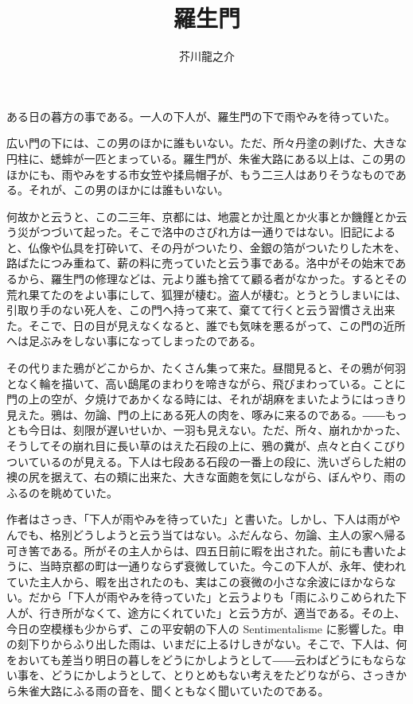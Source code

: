 \documentclass[tate,book,paper=a4]{jlreq}
\title{羅生門}
\author{芥川龍之介}
\begin{document}
\maketitle
ある日の暮方の事である。一人の下人が、羅生門の下で雨やみを待っていた。\par
広い門の下には、この男のほかに誰もいない。ただ、所々丹塗の剥げた、大きな円柱に、蟋蟀が一匹とまっている。羅生門が、朱雀大路にある以上は、この男のほかにも、雨やみをする市女笠や揉烏帽子が、もう二三人はありそうなものである。それが、この男のほかには誰もいない。\par
何故かと云うと、この二三年、京都には、地震とか辻風とか火事とか饑饉とか云う災がつづいて起った。そこで洛中のさびれ方は一通りではない。旧記によると、仏像や仏具を打砕いて、その丹がついたり、金銀の箔がついたりした木を、路ばたにつみ重ねて、薪の料に売っていたと云う事である。洛中がその始末であるから、羅生門の修理などは、元より誰も捨てて顧る者がなかった。するとその荒れ果てたのをよい事にして、狐狸が棲む。盗人が棲む。とうとうしまいには、引取り手のない死人を、この門へ持って来て、棄てて行くと云う習慣さえ出来た。そこで、日の目が見えなくなると、誰でも気味を悪るがって、この門の近所へは足ぶみをしない事になってしまったのである。\par
その代りまた鴉がどこからか、たくさん集って来た。昼間見ると、その鴉が何羽となく輪を描いて、高い鴟尾のまわりを啼きながら、飛びまわっている。ことに門の上の空が、夕焼けであかくなる時には、それが胡麻をまいたようにはっきり見えた。鴉は、勿論、門の上にある死人の肉を、啄みに来るのである。――もっとも今日は、刻限が遅いせいか、一羽も見えない。ただ、所々、崩れかかった、そうしてその崩れ目に長い草のはえた石段の上に、鴉の糞が、点々と白くこびりついているのが見える。下人は七段ある石段の一番上の段に、洗いざらした紺の襖の尻を据えて、右の頬に出来た、大きな面皰を気にしながら、ぼんやり、雨のふるのを眺めていた。\par
作者はさっき、「下人が雨やみを待っていた」と書いた。しかし、下人は雨がやんでも、格別どうしようと云う当てはない。ふだんなら、勿論、主人の家へ帰る可き筈である。所がその主人からは、四五日前に暇を出された。前にも書いたように、当時京都の町は一通りならず衰微していた。今この下人が、永年、使われていた主人から、暇を出されたのも、実はこの衰微の小さな余波にほかならない。だから「下人が雨やみを待っていた」と云うよりも「雨にふりこめられた下人が、行き所がなくて、途方にくれていた」と云う方が、適当である。その上、今日の空模様も少からず、この平安朝の下人の Sentimentalisme に影響した。申の刻下りからふり出した雨は、いまだに上るけしきがない。そこで、下人は、何をおいても差当り明日の暮しをどうにかしようとして――云わばどうにもならない事を、どうにかしようとして、とりとめもない考えをたどりながら、さっきから朱雀大路にふる雨の音を、聞くともなく聞いていたのである。\par
\end{document}
